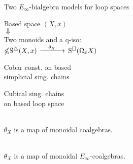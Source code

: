 \begin{frame}[fragile]{Two $E_\infty$-bialgebra models for loop spaces}
	\pause
	\vspace*{-1pt}
	\begin{center}
		Based space $(X,x)$ \\ \pause
		$\Downarrow$ \\
		Two monoids and a q-iso: \\
		\medskip
		$\mathbb{\Omega} \mathrm{S}^{\triangle}(X, x)$
		$\xrightarrow{\quad \theta_X \quad }$
		$\mathrm{S}^{\square}(\Omega_x X)$
	\end{center}

	\begin{minipage}{.45\textwidth}
		\begin{flushright}
			Cobar const. on based \\
			simplicial sing. chains
		\end{flushright}
	\end{minipage}
	\hspace*{.9cm}
	\begin{minipage}{.4\textwidth}
		Cubical sing. chains \\
		on based loop space
	\end{minipage}

	\bigskip\smallskip\pause
	 \\
	$\theta_X$ is a map of monoidal coalgebras.

	\bigskip\pause
	 \\
	$\theta_X$ is a map of monoidal $E_\infty$-coalgebras.

\end{frame}